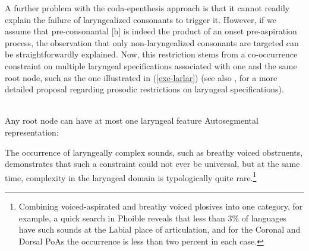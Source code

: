\documentclass[output=paper]{langscibook}
\begin{document}
A further problem with the coda-epenthesis approach is that it cannot readily explain the failure of laryngealized consonants to trigger it. However, if we assume that pre-consonantal [h] is indeed the product of an onset pre-aspiration process, the observation that only non-laryngealized consonants are targeted can be straightforwardly explained. Now, this restriction stems from a co-occurrence constraint on multiple laryngeal specifications associated with one and the same root node, such as the one illustrated in (\ref{exe-larlar}) (see also \citealt{KehreinGolston:2004, GolstonKehrein:2015}, for a more detailed proposal regarding prosodic restrictions on laryngeal specifications).

\begin{exe}
\ex\label{exe-larlar}
\begin{xlist}
	\\
	Any root node can have at most one laryngeal feature
	\ex Autosegmental representation:\smallskip\\
		\noindent
\end{xlist}
\end{exe}

The occurrence of laryngeally complex sounds, such as breathy voiced obstruents, demonstrates that such a constraint could not ever be universal, but at the same time, complexity in the laryngeal domain is typologically quite rare.\footnote{Combining voiced-aspirated and breathy voiced plosives into one category, for example, a quick search in Phoible \citet{MoranMcCloy:2019} reveals that less than 3\% of languages have such sounds at the Labial place of articulation, and for the Coronal and Dorsal PoAs the occurrence is less than two percent in each case.}
\end{document}
